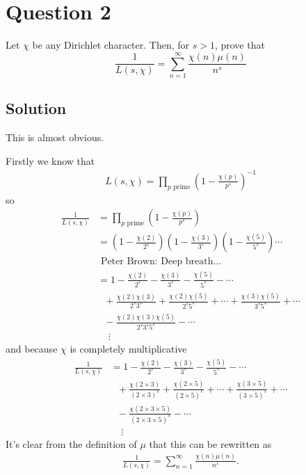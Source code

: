 \documentclass{unswmaths}
\begin{document}
\section*{Question 2}
Let $ \chi $ be any Dirichlet character. Then, for $ s > 1 $, prove that
$$
	\frac{1}{L(s, \chi)} = \sum_{n=1}^\infty \frac{\chi(n)\mu(n)}{n^s}
$$
\subsection*{Solution}
This is almost obvious.

Firstly we know that 
\begin{align*}
	L(s,\chi) = \prod_{p \text{ prime}} \left( 1 - \frac{\chi(p)}{p^s} \right)^{-1}
\end{align*}
so 
\begin{align*}
	\frac{1}{L(s,\chi)} &= \prod_{p \text{ prime}} \left( 1 - \frac{\chi(p)}{p^s} \right) \\
		&= \left( 1 - \frac{\chi(2)}{2^s}\right) \left( 1 - \frac{\chi(3)}{3^s}\right)\left( 1 - \frac{\chi(5)}{5^s}\right)\cdots \\
		&\text{ Peter Brown: Deep breath...} \\
		&= 1 - \frac{\chi(2)}{2^s} - \frac{\chi(3)}{3^s} - \frac{\chi(5)}{5^s} - \cdots \\
		& \ \ \ + \frac{\chi(2)\chi(3)}{2^s3^s} + \frac{\chi(2)\chi(5)}{2^s5^s} + \cdots + \frac{\chi(3)\chi(5)}{3^s5^s} + \cdots \\
		& \ \ \ - \frac{\chi(2)\chi(3)\chi(5)}{2^s3^s5^s} - \cdots \\
		& \ \ \ \ \ \vdots
\end{align*}
and because $ \chi $ is completely multiplicative
\begin{align*}
	\frac{1}{L(s,\chi)}
		&= 1 - \frac{\chi(2)}{2^s} - \frac{\chi(3)}{3^s} - \frac{\chi(5)}{5^s} - \cdots \\
		& \ \ \ + \frac{\chi(2 \times 3)}{(2\times 3)^s} + \frac{\chi(2\times 5)}{(2 \times 5)^s} + \cdots + \frac{\chi(3 \times 5)}{(3 \times 5)^s} + \cdots \\
		& \ \ \ - \frac{\chi(2 \times 3 \times 5)}{(2 \times 3 \times 5)^s} - \cdots \\
		& \ \ \ \ \ \vdots
\end{align*}
It's clear from the definition of $ \mu $ that this can be rewritten as
\begin{align*}
	\frac{1}{L(s,\chi)} = \sum_{n=1}^\infty \frac{\chi(n)\mu(n)}{n^s}.
\end{align*}
\end{document}
